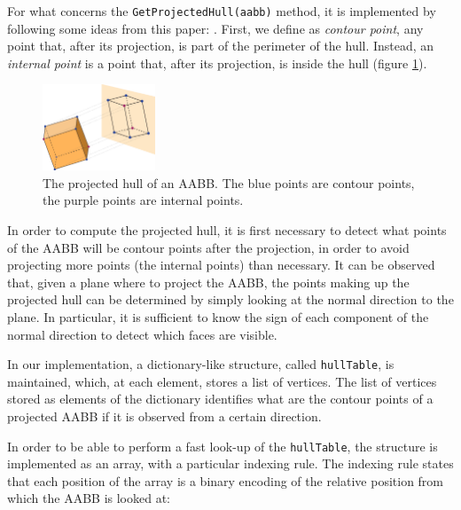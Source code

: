 \documentclass[acmtog, anonymous, review]{acmart}
\begin{document}
For what concerns the \texttt{GetProjectedHull(aabb)} method, it is implemented by following some ideas from this paper: \cite{obb_projection}. First, we define as \textit{contour point}, any point that, after its projection, is part of the perimeter of the hull. Instead, an \textit{internal point} is a point that, after its projection, is inside the hull (figure \ref{fig:contour_internal_points}).

\begin{figure}
  \centering
  \includegraphics[width=0.3\textwidth]{Images/contour_internal_points.png}
  \caption{The projected hull of an AABB. The blue points are contour points, the purple points are internal points.}
  \label{fig:contour_internal_points} 
\end{figure}

In order to compute the projected hull, it is first necessary to detect what points of the AABB will be contour points after the projection, in order to avoid projecting more points (the internal points) than necessary. It can be observed that, given a plane where to project the AABB, the points making up the projected hull can be determined by simply looking at the normal direction to the plane. In particular, it is sufficient to know the sign of each component of the normal direction to detect which faces are visible.

In our implementation, a dictionary-like structure, called \texttt{hullTable}, is maintained, which, at each element, stores a list of vertices. The list of vertices stored as elements of the dictionary identifies what are the contour points of a projected AABB if it is observed from a certain direction.

In order to be able to perform a fast look-up of the \texttt{hullTable}, the structure is implemented as an array, with a particular indexing rule. The indexing rule states that each position of the array is a binary encoding of the relative position from which the AABB is looked at:
\end{document}
